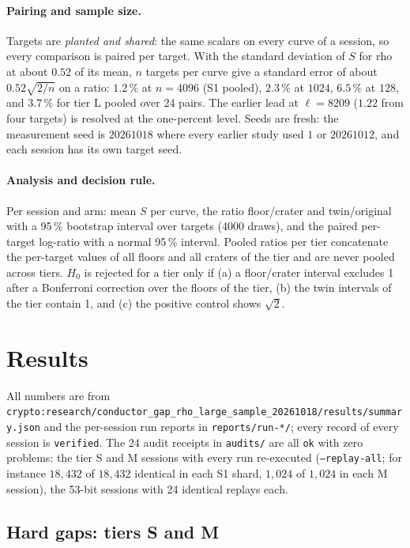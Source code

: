 \documentclass[10pt,a4paper]{article}
\newcommand{\artefact}[1]{\texttt{\small #1}}
\theoremstyle{remark}
\begin{document}
\paragraph{Pairing and sample size.}
Targets are \emph{planted and shared}: the same scalars on every curve of
a session, so every comparison is paired per target. With the standard
deviation of $S$ for rho at about $0.52$ of its mean, $n$ targets per
curve give a standard error of about $0.52\sqrt{2/n}$ on a ratio: $1.2\,\%$
at $n = 4096$ (S1 pooled), $2.3\,\%$ at $1024$, $6.5\,\%$ at $128$, and
$3.7\,\%$ for tier L pooled over 24 pairs. The earlier lead at
$\ell = 8209$ ($1.22$ from four targets) is resolved at the one-percent
level. Seeds are fresh: the measurement seed is $20261018$ where every
earlier study used $1$ or $20261012$, and each session has its own target
seed.

\paragraph{Analysis and decision rule.}
Per session and arm: mean $S$ per curve, the ratio floor/crater and
twin/original with a 95\,\% bootstrap interval over targets (4000 draws),
and the paired per-target log-ratio with a normal 95\,\% interval. Pooled
ratios per tier concatenate the per-target values of all floors and all
craters of the tier and are never pooled across tiers. $H_0$ is rejected
for a tier only if (a) a floor/crater interval excludes 1 after a
Bonferroni correction over the floors of the tier, (b) the twin intervals
of the tier contain 1, and (c) the positive control shows $\sqrt2$.

\section{Results}

All numbers are from
\artefact{crypto:research/conductor\_gap\_rho\_large\_sample\_20261018/results/summary.json}
and the per-session run reports in \artefact{reports/run-*/}; every
record of every session is \texttt{verified}. The 24 audit receipts in
\artefact{audits/} are all \texttt{ok} with zero problems: the tier S and
M sessions with every run re-executed (\texttt{--replay-all}; for
instance $18{,}432$ of $18{,}432$ identical in each S1 shard, $1{,}024$ of
$1{,}024$ in each M session), the 53-bit sessions with 24 identical
replays each.

\subsection{Hard gaps: tiers S and M}
\end{document}
